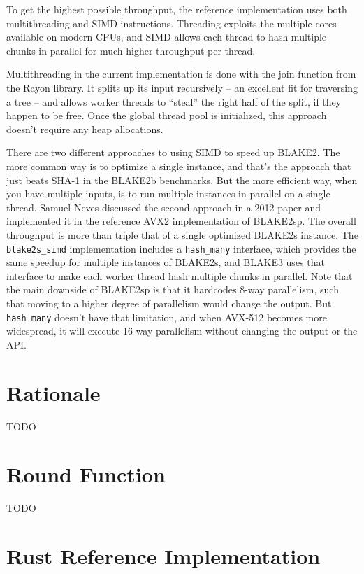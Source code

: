 \documentclass[11pt,notitlepage,a4paper]{article}
\begin{document}
To get the highest possible throughput, the reference implementation uses both multithreading and SIMD instructions. Threading exploits the multiple cores available on modern CPUs, and SIMD allows each thread to hash multiple chunks in parallel for much higher throughput per thread.

Multithreading in the current implementation is done with the join function from the Rayon library. It splits up its input recursively -- an excellent fit for traversing a tree -- and allows worker threads to ``steal'' the right half of the split, if they happen to be free. Once the global thread pool is initialized, this approach doesn't require any heap allocations.

There are two different approaches to using SIMD to speed up BLAKE2. The more common way is to optimize a single instance, and that's the approach that just beats SHA-1 in the BLAKE2b benchmarks. But the more efficient way, when you have multiple inputs, is to run multiple instances in parallel on a single thread. Samuel Neves discussed the second approach in a 2012 paper and implemented it in the reference AVX2 implementation of BLAKE2sp. The overall throughput is more than triple that of a single optimized BLAKE2s instance. The \texttt{blake2s\_simd} implementation includes a \texttt{hash\_many} interface, which provides the same speedup for multiple instances of BLAKE2s, and BLAKE3 uses that interface to make each worker thread hash multiple chunks in parallel. Note that the main downside of BLAKE2sp is that it hardcodes 8-way parallelism, such that moving to a higher degree of parallelism would change the output. But \texttt{hash\_many} doesn't have that limitation, and when AVX-512 becomes more widespread, it will execute 16-way parallelism without changing the output or the API.

\section{Rationale}\label{sec:rationale}

TODO




\begin{appendices}

\section{Round Function}\label{sec:roundfn}

TODO

\section{Rust Reference Implementation}\label{sec:referenceimpl}

\inputminted{rust}{reference_impl.rs}

\end{appendices}
\end{document}
